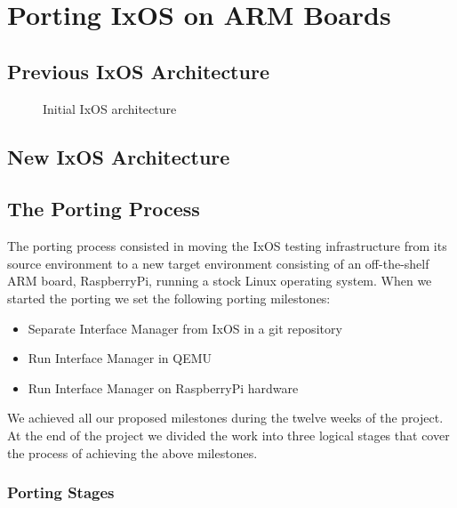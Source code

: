 \section{Porting IxOS on ARM Boards}

\subsection{Previous IxOS Architecture}

\begin{figure*}
    \centering
    \def\svgscale{0.95}
    
    \caption{Initial IxOS architecture}
\end{figure*}

\subsection{New IxOS Architecture}

\subsection{The Porting Process}

The porting process consisted in moving the IxOS testing infrastructure from its
source environment to a new target environment consisting of an off-the-shelf
ARM board, RaspberryPi, running a stock Linux operating system. When we started
the porting we set the following porting milestones:
\begin{itemize}
    \item Separate Interface Manager from IxOS in a git repository
    \item Run Interface Manager in QEMU
    \item Run Interface Manager on RaspberryPi hardware
\end{itemize}
We achieved all our proposed milestones during the twelve weeks of the project.
At the end of the project we divided the work into three logical stages
that cover the process of achieving the above milestones.

\subsubsection{Porting Stages}

